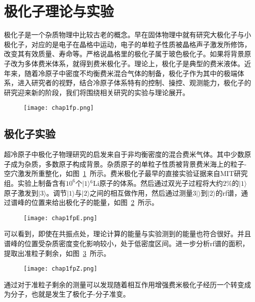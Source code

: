 \section{极化子理论与实验}
极化子是一个杂质物理中比较古老的概念。早在固体物理中就有研究大极化子与小极化子\cite{landau1933bewegung,pekar1946autolocalization,frohlich1950xx,frohlich1954electrons,feynman1955slow,mahanmany}，对应的是电子在晶格中运动，电子的单粒子性质被晶格声子激发所修饰，改变其有效质量、寿命等。严格说晶格里的极化子属于玻色极化子。如果将背景原子改为多体费米体系，就得到费米极化子。理论上，极化子是典型的费米液体。近年来，随着冷原子中密度不均衡费米混合气体的制备，极化子作为其中的极端体系，进入研究者的视野，结合冷原子体系特有的控制、操控、观测能力，极化子的研究迎来新的阶段，我们将围绕相关研究的实验与理论展开。
\begin{figure}[!htbp]
    \centering
    \texttt{[image: chap1fp.png]}
    \label{fp}
\end{figure}

\subsection{极化子实验}
超冷原子中极化子物理研究的启发来自于非均衡密度的混合费米气体。其中少数原子成为杂质，多数原子构成背景。杂质原子的单粒子性质被背景费米海上的粒子-空穴激发所重整化，如图~\ref{fp}~所示。费米极化子最早的直接实验证据来自MIT研究组\cite{Schirotzekobservation}。实验上制备含有$10^6$个$|1\rangle{}^6$Li原子的体系。然后通过双光子过程将大约$2\%$的$|1\rangle$原子激发到$|3\rangle$。调节$|1\rangle$与$|2\rangle$之间的相互做作用，然后通过测量$3|\rangle$到$|2\rangle$的rf谱，通过谱峰的位置来给出极化子的能量，如图~\ref{fpE}~所示。
\begin{figure}[!htbp]
    \centering
    \texttt{[image: chap1fpE.png]}
    \label{fpE}
\end{figure}

可以看到，即使在共振点处，理论计算的能量与实验测到的能量也符合很好。并且谱峰的位置受杂质密度变化影响较小，处于低密度区间。进一步分析rf谱的面积，提取出准粒子剩余，如图~\ref{fpZ}~所示。
\begin{figure}[!htbp]
    \centering
    \texttt{[image: chap1fpZ.png]}
    \label{fpZ}
\end{figure}
通过对于准粒子剩余的测量可以发现随着相互作用增强费米极化子经历一个转变成为分子，也就是发生了极化子-分子准变。

